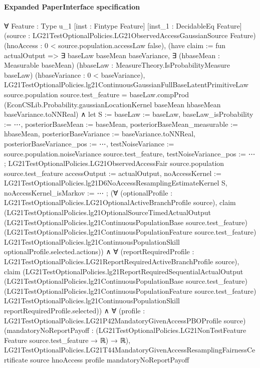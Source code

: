 \documentclass[10pt]{article}
\begin{document}
\paragraph{Expanded PaperInterface specification}
\begin{ReviewVerbatim}
∀ {Feature : Type u_1} [inst : Fintype Feature] [inst_1 : DecidableEq Feature]
  (source : LG21TestOptionalPolicies.LG21ObservedAccessGaussianSource Feature)
  (hnoAccess : 0 < source.population.accessLaw {false}),
  (have claim := fun actualOutput =>
      ∃ baseLaw baseMean baseVariance,
        ∃ (hbaseMean : Measurable baseMean) (hbaseLaw : MeasureTheory.IsProbabilityMeasure baseLaw) (hbaseVariance :
          0 < baseVariance),
          LG21TestOptionalPolicies.lg21ContinuousGaussianFullBaseLatentPrimitiveLaw source.population
                source.test_feature =
              baseLaw.compProd (EconCSLib.Probability.gaussianLocationKernel baseMean hbaseMean baseVariance.toNNReal) ∧
            let S :=
              { baseLaw := baseLaw, baseLaw_isProbability := ⋯, posteriorBaseMean := baseMean,
                posteriorBaseMean_measurable := hbaseMean, posteriorBaseVariance := baseVariance.toNNReal,
                posteriorBaseVariance_pos := ⋯,
                testNoiseVariance := source.population.noiseVariance source.test_feature, testNoiseVariance_pos := ⋯ };
            LG21TestOptionalPolicies.LG21ObservedAccessFair source.population source.test_feature
              { accessOutput := actualOutput,
                noAccessKernel := LG21TestOptionalPolicies.lg21D6NoAccessResamplingEstimateKernel S,
                noAccessKernel_isMarkov := ⋯ };
    (∀ (optionalProfile : LG21TestOptionalPolicies.LG21OptionalActiveBranchProfile source),
        claim
          (LG21TestOptionalPolicies.lg21OptionalSourceTimedActualOutput
            (LG21TestOptionalPolicies.lg21ContinuousPopulationBase source.test_feature)
            (LG21TestOptionalPolicies.lg21ContinuousPopulationFeature source.test_feature)
            LG21TestOptionalPolicies.lg21ContinuousPopulationSkill optionalProfile.selected.actions)) ∧
      ∀ (reportRequiredProfile : LG21TestOptionalPolicies.LG21ReportRequiredActiveBranchProfile source),
        claim
          (LG21TestOptionalPolicies.lg21ReportRequiredSequentialActualOutput
            (LG21TestOptionalPolicies.lg21ContinuousPopulationBase source.test_feature)
            (LG21TestOptionalPolicies.lg21ContinuousPopulationFeature source.test_feature)
            LG21TestOptionalPolicies.lg21ContinuousPopulationSkill reportRequiredProfile.selected)) ∧
    ∀ (profile : LG21TestOptionalPolicies.LG21P42MandatoryGivenAccessPBOProfile source)
      (mandatoryNoReportPayoff : (LG21TestOptionalPolicies.LG21NonTestFeature Feature source.test_feature → ℝ) → ℝ),
      LG21TestOptionalPolicies.LG21T44MandatoryGivenAccessResamplingFairnessCertificate source hnoAccess profile
        mandatoryNoReportPayoff
\end{ReviewVerbatim}
\end{document}
